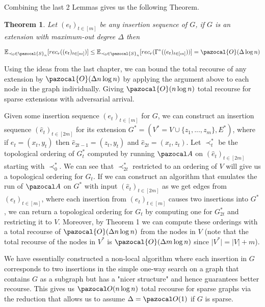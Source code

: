 \documentclass{article}
\newtheorem{theorem}{Theorem}
\begin{document}
Combining the last 2 Lemmas gives us the following Theorem.

\begin{theorem}
Let $(e_t)_{t \in [m]}$ be any insertion sequence of $G$, if $G$ is an extension with maximum-out degree $\Delta$ then

\[ \mathbb{E}_{\prec_0 \in \pazocal{S}_n}[ rec_r((e_t)_{t \in [m]})] \leq \mathbb{E}_{\prec_0 \in \pazocal{S}_n}[ rec_r(\Gamma^*((e_t)_{t \in [m]}))] = \pazocal{O}(\Delta \log n) \]
\end{theorem}

Using the ideas from the last chapter, we can bound the total recourse of any extension by $\pazocal{O}(\Delta n \log n)$ by applying the argument above to each node in the graph individually. Giving $\pazocal{O}(n \log n)$ total recourse for sparse extensions with adversarial arrival.

Given some insertion sequence $(e_t)_{t \in [m]}$ for $G$, we can construct an insertion sequence $(\hat e_t)_{t \in [2m]}$ for its extension $G^*=(V^*=V \cup \{z_1,...,z_m \}, E^*)$, where if $e_t = (x_t, y_t)$ then $\hat e_{2t-1} = (z_t, y_t)$ and $\hat e_{2t} = (x_t, z_t)$. Let $\prec^*_t$ be the topological ordering of $G^*_t$ computed by running $\pazocal A$ on  $(\hat e_t)_{t \in [2m]}$ starting with $\prec^*_0$. We can see that $\prec^*_{2t}$ restricted to an ordering of $V$ will give us a topological ordering for $G_{t}$. If we can construct an algorithm that emulates the run of $\pazocal A$ on $G^*$ with input $(\hat e_t)_{t \in [2m]}$ as we get edges from $(e_t)_{t \in [m]}$, where each insertion from $(e_t)_{t \in [m]}$ causes two insertions into $G^*$, we can return a topological ordering for $G_t$ by computing one for $G^*_{2t}$ and restricting it to $V$. Moreover, by Theorem 1 we can compute these orderings with a total recourse of $\pazocal{O}(\Delta n \log n)$ from the nodes in $V$ (note that the total recourse of the nodes in $V^*$ is $\pazocal{O}(\Delta m \log n)$ since $\vert V^* \vert = \vert V \vert + m$).

We have essentially constructed a non-local algorithm where each insertion in $G$ corresponds to two insertions in the simple one-way search on a graph that contains $G$ as a subgraph but has a "nicer structure" and hence guarantees better recourse. This gives us $\pazocal O(n \log n)$ total recourse for sparse graphs via the reduction that allows us to assume $\Delta = \pazocal O(1)$ if $G$ is sparse.
\end{document}
